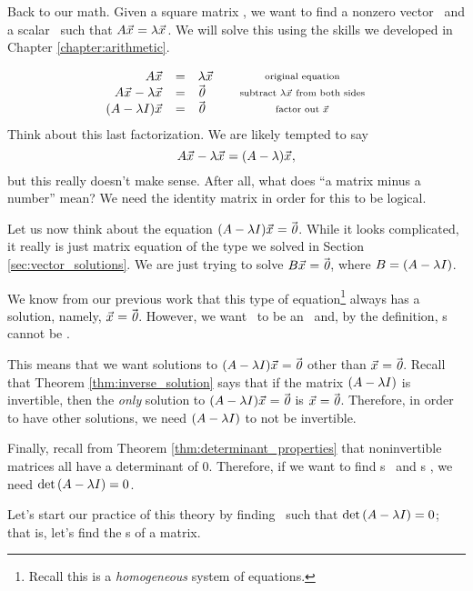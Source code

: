 Back to our math. Given a square matrix \tta, we want to find a nonzero vector \vx\ and a scalar \lda\ such that $A\vec{x_{}} = \lambda\vec{x_{}}$. We will solve this using the skills we developed in Chapter \ref{chapter:arithmetic}.

$$\begin{array}{rclcc}
\tta\vx & = & \lda\vx & &\parbox{100pt}{\centering\scriptsize original equation}\\
\tta\vx - \lda\vx & = & \zero & & \parbox{100pt}{\centering\scriptsize subtract $\lda\vx$ from both sides}\\
(\tta-\lda\tti)\vx & = & \zero & & \parbox{100pt}{\centering\scriptsize factor out \vx}\\
\end{array}$$
Think about this last factorization. We are likely tempted to say $$A\vec{x_{}}-\lambda\vec{x_{}} = (A-\lambda)\vec{x_{}},$$ but this really doesn't make sense. After all, what does ``a matrix minus a number'' mean? We need the identity matrix in order for this to be logical. 

Let us now think about the equation $(A-\lambda I)\vec{x_{}}=\vec{\text{\it 0}}$. While it looks complicated, it really is just matrix equation of the type we solved in Section \ref{sec:vector_solutions}. We are just trying to solve $B\vec{x_{}}=\vec{\text{\it 0}}$, where $B = (A-\lambda I)$.

We know from our previous work that this type of equation\footnote{Recall this is a \textit{homogeneous} system of equations.} always has a solution, namely, $\vec{x_{}} = \vec{\text{\it 0}}$. However, we want \vx\ to be an \ev\ and, by the definition, \ev s cannot be \zero. 

This means that we want solutions to $(A-\lambda I)\vec{x_{}}=\vec{\text{\it 0}}$ other than $\vec{x_{}}=\vec{\text{\it 0}}$. Recall that Theorem \ref{thm:inverse_solution} says that if the matrix $(A-\lambda I)$ is invertible, then the \textit{only} solution to $(A-\lambda I)\vec{x_{}}=\vec{\text{\it 0}}$ is $\vec{x_{}}=\vec{\text{\it 0}}$. Therefore, in order to have other solutions, we need $(A-\lambda I)$ to not be invertible. 

Finally, recall from Theorem \ref{thm:determinant_properties} that noninvertible matrices all have a determinant of 0. Therefore, if we want to find \el s \lda\ and \ev s \vx, we need $\text{det}\left(A-\lambda I\right) = 0$.

Let's start our practice of this theory by finding \lda\ such that $\text{det}\left(A-\lambda I\right) = 0$; that is, let's find the \el s of a matrix.\\

